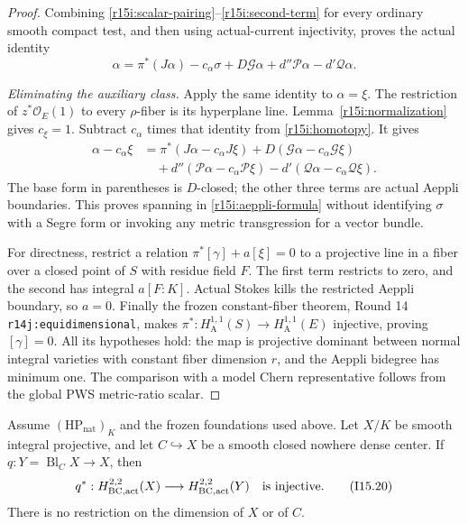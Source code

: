 \begin{proof}
Combining \eqref{r15i:scalar-pairing}--\eqref{r15i:second-term}
for every ordinary smooth compact test, and then using
actual-current injectivity, proves the actual identity
\[
 \alpha=\pi^*(J\alpha)-c_\alpha\sigma
          +D\mathcal G\alpha+d''\mathcal P\alpha
                                      -d'\mathcal Q\alpha.
\tag{I15.18}\label{r15i:homotopy}
\]

\emph{Eliminating the auxiliary class.}
Apply the same identity to $\alpha=\xi$.
The restriction of $z^*\mathcal O_E(1)$ to every
$\rho$-fiber is its hyperplane line.  Lemma~\ref{r15i:normalization}
gives $c_\xi=1$.
Subtract $c_\alpha$ times that identity from
\eqref{r15i:homotopy}.  It gives
\[
 \begin{split}
 \alpha-c_\alpha\xi
   &=\pi^*(J\alpha-c_\alpha J\xi)
       +D(\mathcal G\alpha-c_\alpha\mathcal G\xi)\\
   &\quad+d''(\mathcal P\alpha-c_\alpha\mathcal P\xi)
       -d'(\mathcal Q\alpha-c_\alpha\mathcal Q\xi).
 \end{split}
\tag{I15.19}\label{r15i:normalized-homotopy}
\]
The base form in parentheses is $D$-closed; the other three
terms are actual Aeppli boundaries.  This proves spanning in
\eqref{r15i:aeppli-formula} without identifying $\sigma$
with a Segre form or invoking any metric transgression for
a vector bundle.

For directness, restrict a relation
$\pi^*[\gamma]+a[\xi]=0$ to a projective line in a fiber
over a closed point of $S$ with residue field $F$.
The first term restricts to zero, and the second has integral
$a[F:K]$.  Actual Stokes kills the restricted Aeppli boundary,
so $a=0$.  Finally the frozen constant-fiber theorem,
Round 14 \texttt{r14j:equidimensional}, makes
$\pi^*:H_{\mathrm A}^{1,1}(S)\to H_{\mathrm A}^{1,1}(E)$
injective, proving $[\gamma]=0$.  All its hypotheses hold:
the map is projective dominant between normal integral
varieties with constant fiber dimension $r$, and the
Aeppli bidegree has minimum one.  The comparison with a
model Chern representative follows from the global PWS
metric-ratio scalar.
\end{proof}

\begin{corollary}
\label{r15i:all-smooth-centers}
Assume $(\mathrm{HP}_{\mathrm{nat}})_K$ and the frozen
foundations used above.  Let $X/K$ be smooth integral
projective, and let $C\hookrightarrow X$ be a smooth closed
nowhere dense center.  If $q:Y=\operatorname{Bl}_C X\to X$,
then
\[
          q^*:H_{\mathrm{BC,act}}^{2,2}(X)
                    \longrightarrow H_{\mathrm{BC,act}}^{2,2}(Y)
             \quad\hbox{is injective}.
\tag{I15.20}\label{r15i:all-center-BC22}
\]
There is no restriction on the dimension of $X$ or of $C$.
\end{corollary}

